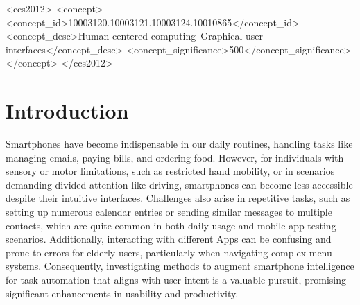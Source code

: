 \begin{CCSXML}
<ccs2012>
   <concept>
       <concept_id>10003120.10003121.10003124.10010865</concept_id>
       <concept_desc>Human-centered computing~Graphical user interfaces</concept_desc>
       <concept_significance>500</concept_significance>
       </concept>
 </ccs2012>
\end{CCSXML}



\maketitle

\section{Introduction}

Smartphones have become indispensable in our daily routines, handling tasks like managing emails, paying bills, and ordering food. However, for individuals with sensory or motor limitations, such as restricted hand mobility, or in scenarios demanding divided attention like driving, smartphones can become less accessible despite their intuitive interfaces. Challenges also arise in repetitive tasks, such as setting up numerous calendar entries or sending similar messages to multiple contacts, which are quite common in both daily usage and mobile app testing scenarios. Additionally, interacting with different Apps can be confusing and prone to errors for elderly users, particularly when navigating complex menu systems. Consequently, investigating methods to augment smartphone intelligence for task automation that aligns with user intent is a valuable pursuit, promising significant enhancements in usability and productivity.

